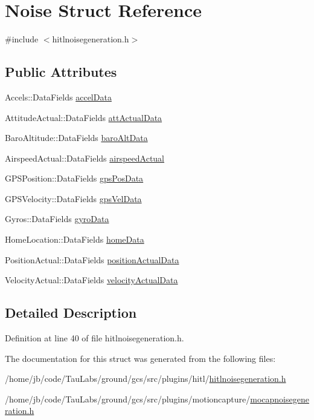 \hypertarget{struct_noise}{\section{\-Noise \-Struct \-Reference}
\label{struct_noise}
}


{\ttfamily \#include $<$hitlnoisegeneration.\-h$>$}

\subsection*{\-Public \-Attributes}
\begin{DoxyCompactItemize}
\item 
\-Accels\-::\-Data\-Fields \hyperlink{group___h_i_t_l_plugin_ga20a9e1e87d0a44b532c7e8c44555bdde}{accel\-Data}
\item 
\-Attitude\-Actual\-::\-Data\-Fields \hyperlink{group___h_i_t_l_plugin_ga689a709ae944673ff6edd54ab6ca4d7d}{att\-Actual\-Data}
\item 
\-Baro\-Altitude\-::\-Data\-Fields \hyperlink{group___h_i_t_l_plugin_gab586e8f2c72c1e42c715debf0bd202b1}{baro\-Alt\-Data}
\item 
\-Airspeed\-Actual\-::\-Data\-Fields \hyperlink{group___h_i_t_l_plugin_ga6481423a6f6cc57475e660281ba3d77d}{airspeed\-Actual}
\item 
\-G\-P\-S\-Position\-::\-Data\-Fields \hyperlink{group___h_i_t_l_plugin_ga9ec5e3f5256aa25ca8a8556643eb355d}{gps\-Pos\-Data}
\item 
\-G\-P\-S\-Velocity\-::\-Data\-Fields \hyperlink{group___h_i_t_l_plugin_gafefa36e4fa6d8da826bbfcf9f604119c}{gps\-Vel\-Data}
\item 
\-Gyros\-::\-Data\-Fields \hyperlink{group___h_i_t_l_plugin_gaf3fae05e7092b987f81f25ff7709ffb9}{gyro\-Data}
\item 
\-Home\-Location\-::\-Data\-Fields \hyperlink{group___h_i_t_l_plugin_ga3138fe65ade5af4ff6ff614c0956fc0a}{home\-Data}
\item 
\-Position\-Actual\-::\-Data\-Fields \hyperlink{group___h_i_t_l_plugin_ga54f9e7005f571fdacf23a67005004b0a}{position\-Actual\-Data}
\item 
\-Velocity\-Actual\-::\-Data\-Fields \hyperlink{group___h_i_t_l_plugin_ga45f843b87142396306b05148bf19b766}{velocity\-Actual\-Data}
\end{DoxyCompactItemize}


\subsection{\-Detailed \-Description}


\-Definition at line 40 of file hitlnoisegeneration.\-h.



\-The documentation for this struct was generated from the following files\-:\begin{DoxyCompactItemize}
\item 
/home/jb/code/\-Tau\-Labs/ground/gcs/src/plugins/hitl/\hyperlink{hitlnoisegeneration_8h}{hitlnoisegeneration.\-h}\item 
/home/jb/code/\-Tau\-Labs/ground/gcs/src/plugins/motioncapture/\hyperlink{mocapnoisegeneration_8h}{mocapnoisegeneration.\-h}\end{DoxyCompactItemize}
